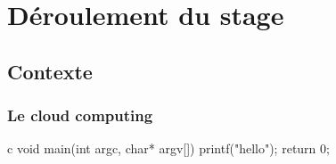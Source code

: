 \part{Déroulement du stage}
\chapter{Contexte}
\section{Le cloud computing}


\begin{pygmented}{c}
void main(int argc, char* argv[])
{
	printf("hello");
	return 0;
}
\end{pygmented}

\cite{test}
